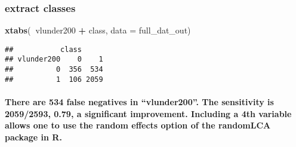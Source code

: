 \documentclass[
]{article}
\newenvironment{Shaded}{\begin{snugshade}}{\end{snugshade}}
\newcommand{\DataTypeTok}[1]{\textcolor[rgb]{0.13,0.29,0.53}{#1}}
\newcommand{\DecValTok}[1]{\textcolor[rgb]{0.00,0.00,0.81}{#1}}
\newcommand{\KeywordTok}[1]{\textcolor[rgb]{0.13,0.29,0.53}{\textbf{#1}}}
\newcommand{\NormalTok}[1]{#1}
\newcommand{\OperatorTok}[1]{\textcolor[rgb]{0.81,0.36,0.00}{\textbf{#1}}}
\newcommand{\OtherTok}[1]{\textcolor[rgb]{0.56,0.35,0.01}{#1}}
\newcommand{\StringTok}[1]{\textcolor[rgb]{0.31,0.60,0.02}{#1}}
\let\oldparagraph\paragraph
\renewcommand{\paragraph}[1]{\oldparagraph{#1}\mbox{}}
\begin{document}
\hypertarget{extract-classes-3}{%
\subsubsection{extract classes}\label{extract-classes-3}}

\begin{Shaded}
\end{Shaded}

\begin{Shaded}
\end{Shaded}

\begin{Shaded}
\begin{Highlighting}[]
\KeywordTok{xtabs}\NormalTok{(}\OperatorTok{~}\NormalTok{vlunder200 }\OperatorTok{+}\StringTok{ }\NormalTok{class, }\DataTypeTok{data =}\NormalTok{ full_dat_out)}
\end{Highlighting}
\end{Shaded}

\begin{verbatim}
##           class
## vlunder200    0    1
##          0  356  534
##          1  106 2059
\end{verbatim}

\hypertarget{there-are-534-false-negatives-in-vlunder200.-the-sensitivity-is-20592593-0.79-a-significant-improvement.-including-a-4th-variable-allows-one-to-use-the-random-effects-option-of-the-randomlca-package-in-r.}{%
\paragraph{There are 534 false negatives in ``vlunder200''. The
sensitivity is 2059/2593, 0.79, a significant improvement. Including a
4th variable allows one to use the random effects option of the
randomLCA package in
R.}\label{there-are-534-false-negatives-in-vlunder200.-the-sensitivity-is-20592593-0.79-a-significant-improvement.-including-a-4th-variable-allows-one-to-use-the-random-effects-option-of-the-randomlca-package-in-r.}}
\end{document}
